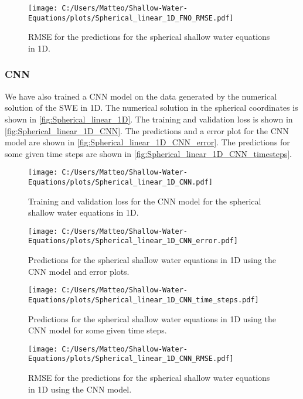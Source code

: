 \begin{figure}[H]
    \centering
    \texttt{[image: C:/Users/Matteo/Shallow-Water-Equations/plots/Spherical\_linear\_1D\_FNO\_RMSE.pdf]}
    \caption{RMSE for the predictions for the spherical shallow water equations in 1D.}\label{fig:Spherical_linear_1D_FNO_RMSE}
\end{figure}

\subsubsection{CNN}
We have also trained a CNN model on the data generated by the numerical solution of the SWE in 1D.
The numerical solution in the spherical coordinates is shown in \autoref{fig:Spherical_linear_1D}.
The training and validation loss is shown in \autoref{fig:Spherical_linear_1D_CNN}.
The predictions and a error plot for the CNN model are shown in \autoref{fig:Spherical_linear_1D_CNN_error}.
The predictions for some given time steps are shown in \autoref{fig:Spherical_linear_1D_CNN_timesteps}.


\begin{figure}[H]
    \centering
    \texttt{[image: C:/Users/Matteo/Shallow-Water-Equations/plots/Spherical\_linear\_1D\_CNN.pdf]}
    \caption{Training and validation loss for the CNN model for the spherical shallow water equations in 1D.}\label{fig:Spherical_linear_1D_CNN}
\end{figure}

\begin{figure}[H]
    \centering
    \texttt{[image: C:/Users/Matteo/Shallow-Water-Equations/plots/Spherical\_linear\_1D\_CNN\_error.pdf]}
    \caption{Predictions for the spherical shallow water equations in 1D using the CNN model and error plots.}\label{fig:Spherical_linear_1D_CNN_error}
\end{figure}

\begin{figure}[H]
    \centering
    \texttt{[image: C:/Users/Matteo/Shallow-Water-Equations/plots/Spherical\_linear\_1D\_CNN\_time\_steps.pdf]}
    \caption{Predictions for the spherical shallow water equations in 1D using the CNN model for some given time steps.}\label{fig:Spherical_linear_1D_CNN_timesteps}
\end{figure}

\begin{figure}[H]
    \centering
    \texttt{[image: C:/Users/Matteo/Shallow-Water-Equations/plots/Spherical\_linear\_1D\_CNN\_RMSE.pdf]}
    \caption{RMSE for the predictions for the spherical shallow water equations in 1D using the CNN model.}\label{fig:Spherical_linear_1D_CNN_RMSE}
\end{figure}

